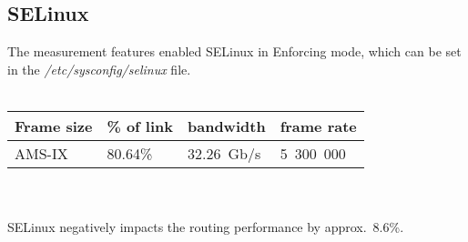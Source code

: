 
\subsection{SELinux}
The measurement features enabled SELinux in Enforcing mode, which can be set in the {\it{/etc/sysconfig/selinux}} file.
\\
\\
\begin{tabular}{ | l | l | l | l | }
\hline
Frame size & \% of link & bandwidth & frame rate \\
\hline
AMS-IX & 80.64\% & 32.26~Gb/s & 5~300~000 \\
\hline
\end{tabular}
\\
\\
SELinux negatively impacts the routing performance by approx.~8.6\%.
